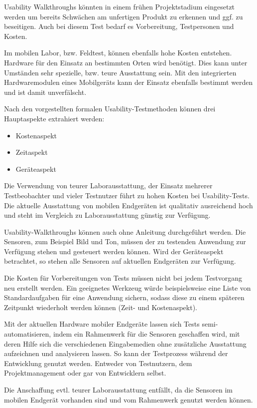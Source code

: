Usability Walkthroughs könnten in einem frühen Projektstadium eingesetzt werden um bereits Schwächen am unfertigen Produkt zu erkennen und ggf. zu beseitigen. 
Auch bei diesem Test bedarf es Vorbereitung, Testpersonen und Kosten.

Im mobilen Labor, bzw. Feldtest, können ebenfalls hohe Kosten entstehen. 
Hardware für den Einsatz an bestimmten Orten wird benötigt. 
Dies kann unter Umständen sehr spezielle, bzw. teure Ausstattung sein. 
Mit den integrierten Hardwaremodulen eines Mobilgeräts kann der Einsatz ebenfalls bestimmt werden und ist damit unverfälscht.

Nach den vorgestellten formalen Usability-Testmethoden können drei Hauptaspekte extrahiert werden: 
\begin{itemize}
	\item{Kostenaspekt}
	\item{Zeitaspekt}
	\item{Geräteaspekt}
\end{itemize}

Die Verwendung von teurer Laborausstattung, der Einsatz mehrerer Testbeobachter und vieler Testnutzer führt zu hohen Kosten bei Usability-Tests. 
Die aktuelle Ausstattung von mobilen Endgeräten ist qualitativ ausreichend hoch und steht im Vergleich zu Laborausstattung günstig zur Verfügung. 

Usability-Walkthroughs können auch ohne Anleitung durchgeführt werden. 
Die Sensoren, zum Beispiel Bild und Ton, müssen der zu testenden Anwendung zur Verfügung stehen und gesteuert werden können. 
Wird der Geräteaspekt betrachtet, so stehen alle Sensoren auf aktuellen Endgeräten zur Verfügung.

Die Kosten für Vorbereitungen von Tests müssen nicht bei jedem Testvorgang neu erstellt werden. Ein geeignetes Werkzeug würde beispielsweise eine Liste von Standardaufgaben für eine Anwendung sichern, sodass diese zu einem späteren Zeitpunkt wiederholt werden können (Zeit- und Kostenaspekt). 

Mit der aktuellen Hardware mobiler Endgeräte lassen sich Tests semi-automatisieren, indem ein Rahmenwerk für die Sensoren geschaffen wird, mit deren Hilfe sich die verschiedenen Eingabemedien ohne zusätzliche Ausstattung aufzeichnen und analysieren lassen. 
So kann der Testprozess während der Entwicklung genutzt werden. 
Entweder von Testnutzern, dem Projektmanagement oder gar von Entwicklern selbst. 

Die Anschaffung evtl. teurer Laborausstattung entfällt, da die Sensoren im mobilen Endgerät vorhanden sind und vom Rahmenwerk genutzt werden können. 

